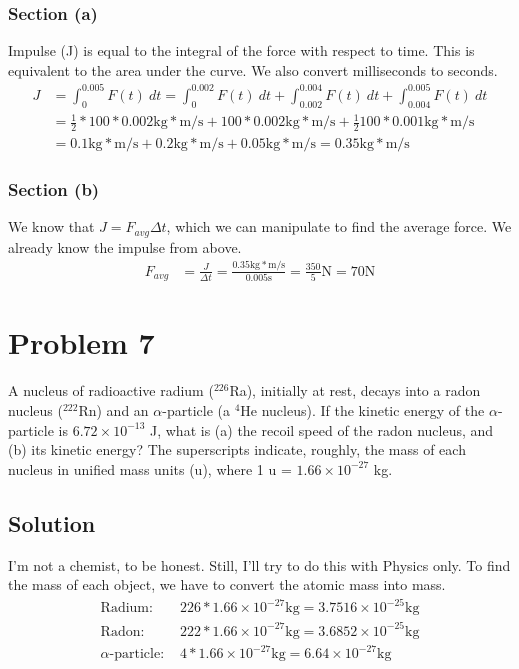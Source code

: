 \documentclass[12pt]{article}
\begin{document}
\subsubsection*{Section (a)}
Impulse (J) is equal to the integral of the force with respect to time. This is equivalent to the area under the curve. We also convert milliseconds to seconds.
\begin{align*}
    J   &=  \int_{0}^{0.005} F(t)\ dt
        =   \int_{0}^{0.002} F(t)\ dt + \int_{0.002}^{0.004} F(t)\ dt + \int_{0.004}^{0.005} F(t)\ dt\\
        &=  \frac{1}{2}*100*0.002 \unit{\kilo\gram*\meter/\second} + 100*0.002 \unit{\kilo\gram*\meter/\second} + \frac{1}{2}100*0.001 \unit{\kilo\gram*\meter/\second}\\
        &=  0.1 \unit{\kilo\gram*\meter/\second} + 0.2 \unit{\kilo\gram*\meter/\second} + 0.05 \unit{\kilo\gram*\meter/\second}
        =   \boxed{0.35 \unit{\kilo\gram*\meter/\second}}
\end{align*}

\subsubsection*{Section (b)}
We know that \( J = F_{avg}\Delta t \), which we can manipulate to find the average force. We already know the impulse from above.
\begin{align*}
    F_{avg} &=  \frac{J}{\Delta t}
        =   \frac{0.35 \unit{\kilo\gram*\meter/\second}}{0.005 \unit{\second}}
        =   \frac{350}{5}\unit{\newton}
        =   \boxed{ 70\unit{\newton} }
\end{align*}

\pagebreak
\section*{Problem 7}
A nucleus of radioactive radium ($^{226}$Ra), initially at rest, decays into a radon nucleus ($^{222}$Rn) and an $\alpha$-particle (a $^{4}$He nucleus). If the kinetic energy of the $\alpha$-particle is $6.72 \times 10^{-13}$ J, what is (a) the recoil speed of the radon nucleus, and (b) its kinetic energy? The superscripts indicate, roughly, the mass of each nucleus in unified mass units (u), where 1 u = $1.66 \times 10^{-27}$ kg.

\subsection*{Solution}
I'm not a chemist, to be honest. Still, I'll try to do this with Physics only. To find the mass of each object, we have to convert the atomic mass into mass.
\begin{align*}
    \text{Radium: }&    226 * 1.66\times 10^{-27}\unit{\kilo\gram} = 3.7516\times 10^{-25}\unit{\kilo\gram}\\
    \text{Radon: }&    222 * 1.66\times 10^{-27}\unit{\kilo\gram} = 3.6852\times 10^{-25}\unit{\kilo\gram}\\
    \alpha\text{-particle: }&    4 * 1.66\times 10^{-27}\unit{\kilo\gram} = 6.64\times 10^{-27}\unit{\kilo\gram}
\end{align*}
\end{document}
